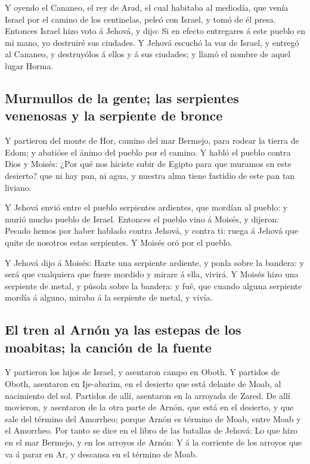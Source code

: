  Y oyendo el Cananeo, el rey de Arad, el cual habitaba al
mediodía, que venía Israel por el camino de los centinelas, peleó con
Israel, y tomó de él presa.  Entonces Israel hizo voto á
Jehová, y dijo: Si en efecto entregares á este pueblo en mi mano, yo
destruiré sus ciudades.  Y Jehová escuchó la voz de Israel,
y entregó al Cananeo, y destruyólos á ellos y á sus ciudades; y llamó el
nombre de aquel lugar Horma.

\hypertarget{murmullos-de-la-gente-las-serpientes-venenosas-y-la-serpiente-de-bronce}{%
\subsection{Murmullos de la gente; las serpientes venenosas y la
serpiente de
bronce}\label{murmullos-de-la-gente-las-serpientes-venenosas-y-la-serpiente-de-bronce}}

 Y partieron del monte de Hor, camino del mar Bermejo, para
rodear la tierra de Edom; y abatióse el ánimo del pueblo por el camino.
 Y habló el pueblo contra Dios y Moisés: ¿Por qué nos
hiciste subir de Egipto para que muramos en este desierto? que ni hay
pan, ni agua, y nuestra alma tiene fastidio de este pan tan liviano.

 Y Jehová envió entre el pueblo serpientes ardientes, que
mordían al pueblo: y murió mucho pueblo de Israel.  Entonces
el pueblo vino á Moisés, y dijeron: Pecado hemos por haber hablado
contra Jehová, y contra ti: ruega á Jehová que quite de nosotros estas
serpientes. Y Moisés oró por el pueblo.

 Y Jehová dijo á Moisés: Hazte una serpiente ardiente, y
ponla sobre la bandera: y será que cualquiera que fuere mordido y mirare
á ella, vivirá.  Y Moisés hizo una serpiente de metal, y
púsola sobre la bandera: y fué, que cuando alguna serpiente mordía á
alguno, miraba á la serpiente de metal, y vivía.

\hypertarget{el-tren-al-arnuxf3n-ya-las-estepas-de-los-moabitas-la-canciuxf3n-de-la-fuente}{%
\subsection{El tren al Arnón ya las estepas de los moabitas; la canción
de la
fuente}\label{el-tren-al-arnuxf3n-ya-las-estepas-de-los-moabitas-la-canciuxf3n-de-la-fuente}}

 Y partieron los hijos de Israel, y asentaron campo en
Oboth.  Y partidos de Oboth, asentaron en Ije-abarim, en el
desierto que está delante de Moab, al nacimiento del sol. 
Partidos de allí, asentaron en la arroyada de Zared.  De
allí movieron, y asentaron de la otra parte de Arnón, que está en el
desierto, y que sale del término del Amorrheo; porque Arnón es término
de Moab, entre Moab y el Amorrheo.  Por tanto se dice en el
libro de las batallas de Jehová: Lo que hizo en el mar Bermejo, y en los
arroyos de Arnón:  Y á la corriente de los arroyos que va á
parar en Ar, y descansa en el término de Moab.

